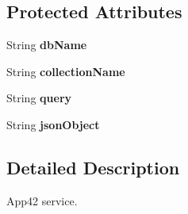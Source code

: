 \subsection*{Protected Attributes}
\begin{DoxyCompactItemize}
\item 
\hypertarget{classcom_1_1shephertz_1_1app42_1_1paas_1_1sdk_1_1csharp_1_1_app42_service_ab1fe3c955e785d4d93deec0f20fc33fe}{String {\bfseries db\+Name}}\label{classcom_1_1shephertz_1_1app42_1_1paas_1_1sdk_1_1csharp_1_1_app42_service_ab1fe3c955e785d4d93deec0f20fc33fe}

\item 
\hypertarget{classcom_1_1shephertz_1_1app42_1_1paas_1_1sdk_1_1csharp_1_1_app42_service_abb9aa25d31dbd8c67a7649f776feebf6}{String {\bfseries collection\+Name}}\label{classcom_1_1shephertz_1_1app42_1_1paas_1_1sdk_1_1csharp_1_1_app42_service_abb9aa25d31dbd8c67a7649f776feebf6}

\item 
\hypertarget{classcom_1_1shephertz_1_1app42_1_1paas_1_1sdk_1_1csharp_1_1_app42_service_a7b9f5e451b0490203bb64b96401c0f2e}{String {\bfseries query}}\label{classcom_1_1shephertz_1_1app42_1_1paas_1_1sdk_1_1csharp_1_1_app42_service_a7b9f5e451b0490203bb64b96401c0f2e}

\item 
\hypertarget{classcom_1_1shephertz_1_1app42_1_1paas_1_1sdk_1_1csharp_1_1_app42_service_a3bffdf14d9b995c6524e8b96d646dfe0}{String {\bfseries json\+Object}}\label{classcom_1_1shephertz_1_1app42_1_1paas_1_1sdk_1_1csharp_1_1_app42_service_a3bffdf14d9b995c6524e8b96d646dfe0}

\end{DoxyCompactItemize}


\subsection{Detailed Description}
App42 service. 



